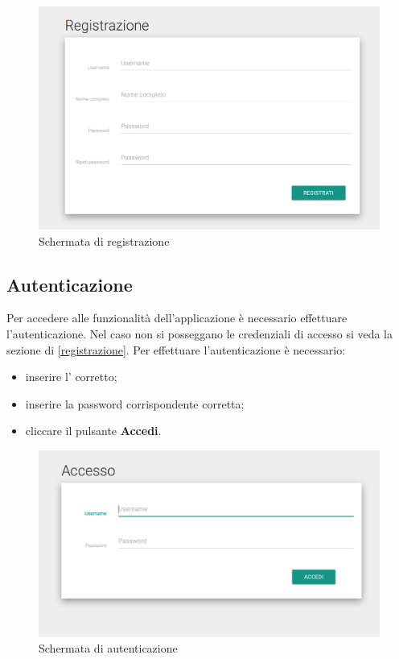 \documentclass[12pt,a4paper]{article}
\begin{document}
\begin{figure}[h]
		
\centering
\includegraphics[width=\linewidth]{../img/screenshot/signup.png}
\caption{Schermata di registrazione}
\label{Schermata di registrazione}
\end{figure}


	\subsection{Autenticazione}\label{autenticazione}
	Per accedere alle funzionalità dell'applicazione è necessario effettuare l'autenticazione. Nel caso non si posseggano le credenziali di accesso si veda la sezione di \ref{registrazione}.
	Per effettuare l'autenticazione è necessario:
	\begin{itemize}
		\item inserire l' corretto;
		\item inserire la password corrispondente corretta;
		\item cliccare il pulsante \textbf{Accedi}.
	\end{itemize}
	
		\begin{figure}[h]
		
		\centering
		\includegraphics[width=\linewidth]{../img/screenshot/loginCrop.png}
		\caption{Schermata di autenticazione}
		\label{Schermata di autenticazione}
		\end{figure}
		
\end{document}
